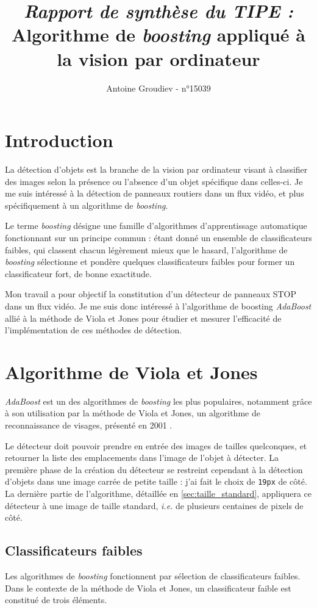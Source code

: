 \documentclass[12pt,a4paper]{article}
\author{Antoine Groudiev - n°15039}
\date{\vspace{-6ex}}
\title{\textit{Rapport de synthèse du TIPE :} \\ Algorithme de \textit{boosting} appliqué à la vision par ordinateur}
\begin{document}
\maketitle

\section*{Introduction}
La détection d'objets est la branche de la vision par ordinateur visant à classifier des images selon la présence ou l'absence d'un objet spécifique dans celles-ci. Je me suis intéressé à la détection de panneaux routiers dans un flux vidéo, et plus spécifiquement à un algorithme de \textit{boosting}. 

Le terme \textit{boosting} désigne une famille d'algorithmes d'apprentissage automatique fonctionnant sur un principe commun : étant donné un ensemble de classificateurs faibles, qui classent chacun légèrement mieux que le hasard, l'algorithme de \textit{boosting} sélectionne et pondère quelques classificateurs faibles pour former un classificateur fort, de bonne exactitude.

Mon travail a pour objectif la constitution d'un détecteur de panneaux STOP dans un flux vidéo. Je me suis donc intéressé à l'algorithme de boosting \textit{AdaBoost} allié à la méthode de Viola et Jones pour étudier et mesurer l'efficacité de l'implémentation de ces méthodes de détection.

\section{Algorithme de Viola et Jones}
\textit{AdaBoost} est un des algorithmes de \textit{boosting} les plus populaires, notamment grâce à son utilisation par la méthode de Viola et Jones, un algorithme de reconnaissance de visages, présenté en 2001 \cite{viola-jones}.

Le détecteur doit pouvoir prendre en entrée des images de tailles quelconques, et retourner la liste des emplacements dans l'image de l'objet à détecter. La première phase de la création du détecteur se restreint cependant à la détection d'objets dans une image carrée de petite taille : j'ai fait le choix de \texttt{19px} de côté. La dernière partie de l'algorithme, détaillée en \ref{sec:taille_standard}, appliquera ce détecteur à une image de taille standard, \textit{i.e.} de plusieurs centaines de pixels de côté.

\subsection{Classificateurs faibles}
Les algorithmes de \textit{boosting} fonctionnent par sélection de classificateurs faibles. Dans le contexte de la méthode de Viola et Jones, un classificateur faible est constitué de trois éléments.
\end{document}
